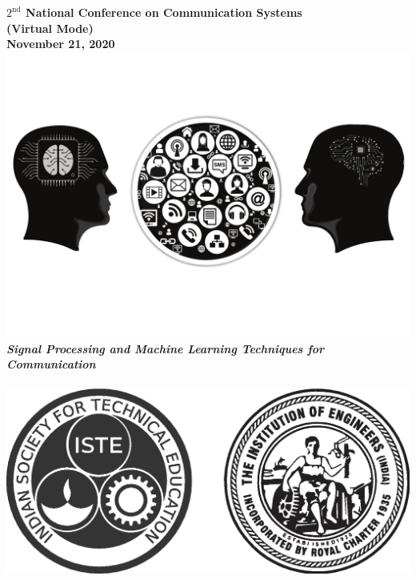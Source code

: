\documentclass[12pt,a3paper, foldmark,notumble]{leaflet}
\begin{document}
\begin{center}
	\textbf{\color{orange} {\LARGE $\text{2}^{\text{nd}}$ National Conference on Communication Systems}}\\
	\textbf{\color{orange} {\LARGE (Virtual Mode)}}\\
	\textbf{\color{orange} {\LARGE November 21, 2020}}\vspace{0.25cm}\\
	\includegraphics[scale=0.30,trim={0cm, 4cm, 0cm, 3cm},clip]{Logo2.pdf} \vspace{-0.20cm}\\
	\textbf{\color{orange} {\Large \textit{Signal Processing and Machine Learning Techniques for Communication}}}\\ \vspace{0.25cm}
	\textbf{{\color{black}{\Large in association with}}}\\ \vspace{0.25cm}
	\includegraphics[scale=0.375]{two_logos.eps}\\ \vspace{0.25cm}

\end{center}
\end{document}
